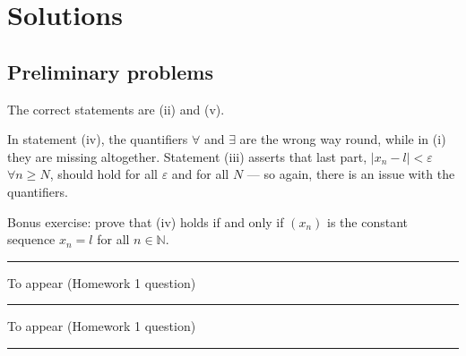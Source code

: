 \documentclass[letterpaper,10pt,english]{jupyterBook}
\begin{document}
\sphinxstepscope


\section{Solutions}
\label{\detokenize{Solutions-upto6:solutions}}\label{\detokenize{Solutions-upto6:sol}}\label{\detokenize{Solutions-upto6::doc}}

\subsection{Preliminary problems}
\label{\detokenize{Solutions-upto6:preliminary-problems}}\label{\detokenize{Solutions-upto6:ch1sol}}
\sphinxAtStartPar
{\hyperref[\detokenize{Problems:p1}]{}}
The correct statements are (ii) and (v).

\sphinxAtStartPar
In statement (iv), the quantifiers \(\forall\) and \(\exists\) are the wrong way round, while in (i) they are missing altogether. Statement (iii) asserts that last part, \(|x_n-l|<\varepsilon\) \(\forall n\geq N\), should hold for all \(\varepsilon\) and for all \(N\) — so again, there is an issue with the quantifiers.

\sphinxAtStartPar
Bonus exercise: prove that (iv) holds if and only if \((x_n)\) is the constant sequence \(x_n=l\) for all \(n\in\mathbb{N}\).


\bigskip\hrule\bigskip


\sphinxAtStartPar
{\hyperref[\detokenize{Problems:p2}]{}} To appear (Homework 1 question)


\bigskip\hrule\bigskip


\sphinxAtStartPar
{\hyperref[\detokenize{Problems:p3}]{}} To appear (Homework 1 question)


\bigskip\hrule\bigskip
\end{document}
